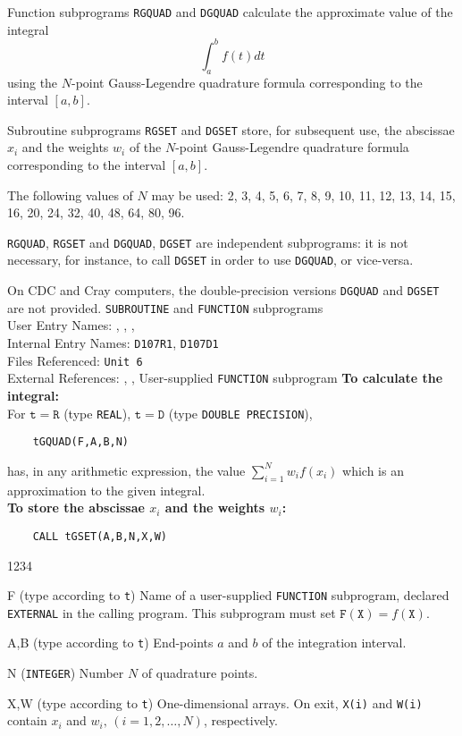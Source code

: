                              
                       
                   
                          \Revised{}
Function subprograms {\tt RGQUAD} and {\tt DGQUAD} calculate the
approximate value of the integral
 $$ \int_a^b f(t)dt $$
using the $N$-point Gauss-Legendre quadrature formula corresponding to
the interval $[a,b]$.
\par
Subroutine subprograms {\tt RGSET} and {\tt DGSET} store, for
subsequent use, the abscissae $x_i$ and the weights $w_i$ of the
$N$-point Gauss-Legendre quadrature formula corresponding to the
interval $[a,b]$.
\par
The following values of $N$ may be used:
2, 3, 4, 5, 6, 7, 8, 9, 10, 11, 12, 13, 14, 15, 16,
20, 24, 32, 40, 48, 64, 80, 96.
\par
{\tt RGQUAD}, {\tt RGSET} and {\tt DGQUAD}, {\tt DGSET} are independent
subprograms: it is not necessary, for instance, to call {\tt DGSET} in
order to use {\tt DGQUAD}, or vice-versa.
\par
On CDC and Cray computers, the double-precision versions {\tt DGQUAD}
and {\tt DGSET} are not provided.
\Structure
{\tt SUBROUTINE} and {\tt FUNCTION} subprograms \\
User Entry Names: , , ,
 \\
Internal Entry Names: {\tt D107R1}, {\tt D107D1}  \\
Files Referenced: {\tt Unit 6} \\
External References: , ,
User-supplied {\tt FUNCTION} subprogram
\Usage
{\bf To calculate the integral:}  \\[2mm]
For $\mathtt{t=R}$ (type {\tt REAL}), $\mathtt{t=D}$ (type
{\tt DOUBLE PRECISION}),
\begin{verbatim}
    tGQUAD(F,A,B,N)
\end{verbatim}
has, in any arithmetic expression, the value
$\displaystyle \sum_{i=1}^N w_if(x_i)$
which is an approximation to the given integral. \\[3mm]
{\bf To store the abscissae $x_i$ and the weights $w_i$:}
\begin{verbatim}
    CALL tGSET(A,B,N,X,W)
\end{verbatim}
\begin{DLtt}{1234}
\item[F] (type according to {\tt t}) Name of a user-supplied
{\tt FUNCTION} subprogram, declared {\tt EXTERNAL} in the calling
program. This subprogram must set $\mathtt{F(X)} = f(\mathtt{X})$.
\item [A,B] (type according to {\tt t}) End-points $a$ and $b$ of
the integration interval.
\item [N] ({\tt INTEGER}) Number $N$ of quadrature points.
\item[X,W] (type according to {\tt t}) One-dimensional arrays. On exit,
{\tt X(i)} and {\tt W(i)} contain $x_i$ and $w_i,\,(i=1,2,\ldots,N)$,
respectively.
\end{DLtt}
